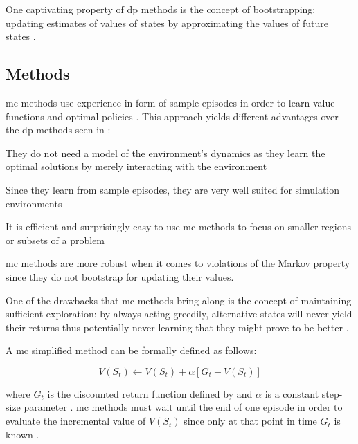 One captivating property of \gls{dp} methods is the concept of bootstrapping: updating estimates of values of states by approximating the values of future states \citep[p. 96]{Sutton2017}.

\subsection{ Methods}
\label{subsec:mc}

\gls{mc} methods use experience in form of sample episodes in order to learn value functions and optimal policies \citep[p. 123]{Sutton2017}. This approach yields different advantages over the \gls{dp} methods seen in  \citep[p. 123]{Sutton2017}:
\begin{enumerate*}
	\item They do not need a model of the environment's dynamics as they learn the optimal solutions by merely interacting with the environment
	\item Since they learn from sample episodes, they are very well suited for simulation environments
	\item It is efficient and surprisingly easy to use \gls{mc} methods to focus on smaller regions or subsets of a problem
	\item \gls{mc} methods are more robust when it comes to violations of the Markov property since they do not bootstrap for updating their values.
\end{enumerate*}

One of the drawbacks that \gls{mc} methods bring along is the concept of maintaining sufficient exploration: by always acting greedily, alternative states will never yield their returns thus potentially never learning that they might prove to be better \citep[p. 123]{Sutton2017}.

A \gls{mc} simplified method can be formally defined as follows:

\begin{equation}
\label{eq:mc_update}
	V(S_t) \leftarrow V(S_t) + \alpha [G_t - V(S_t)]
\end{equation}

where $G_t$ is the discounted return function defined by  and $\alpha$ is a constant step-size parameter \citep[p. 127]{Sutton2017}. \gls{mc} methods must wait until the end of one episode in order to evaluate the incremental value of $V(S_t)$ since only at that point in time $G_t$ is known \citep[p. 128]{Sutton2017}.

